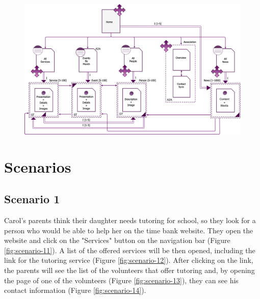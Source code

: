 \documentclass[a4paper, 11pt, parskip=half, headsepline]{scrreprt}
\begin{document}
\begin{figure}[H]
    \centering
    \includegraphics[width=1\linewidth, keepaspectratio]{IDM/P-IDM}
\end{figure}

\chapter{Scenarios}

\section{Scenario 1}

Carol's parents think their daughter needs tutoring for school, so they look for a person who would be able to help her on the time bank website. They open the website and click on the "Services" button on the navigation bar (Figure \ref{fig:scenario-11}). A list of the offered services will be then opened, including the link for the tutoring service (Figure \ref{fig:scenario-12}). After clicking on the link, the parents will see the list of the volunteers that offer tutoring and, by opening the page of one of the volunteers (Figure \ref{fig:scenario-13}), they can see his contact information (Figure \ref{fig:scenario-14}).
\end{document}
